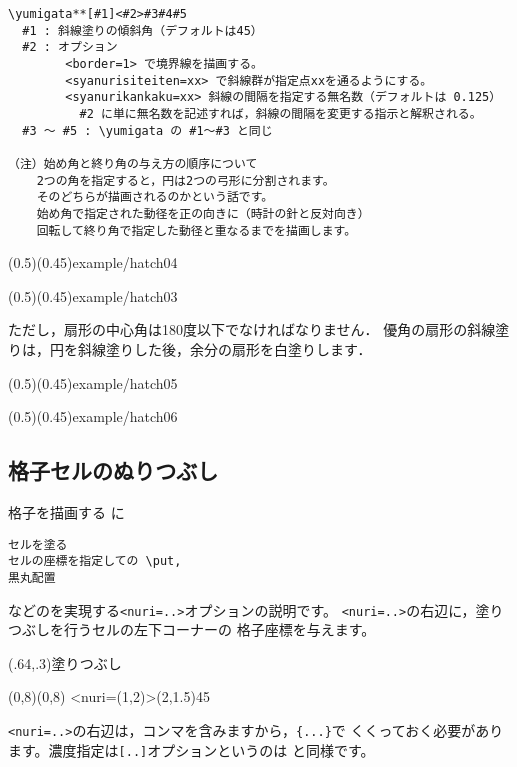 \begin{boxnote}
\begin{verbatim}
\yumigata**[#1]<#2>#3#4#5
  #1 : 斜線塗りの傾斜角（デフォルトは45）
  #2 : オプション
        <border=1> で境界線を描画する。
        <syanurisiteiten=xx> で斜線群が指定点xxを通るようにする。
        <syanurikankaku=xx> 斜線の間隔を指定する無名数（デフォルトは 0.125）
          #2 に単に無名数を記述すれば，斜線の間隔を変更する指示と解釈される。
  #3 〜 #5 : \yumigata の #1〜#3 と同じ

（注）始め角と終り角の与え方の順序について
    2つの角を指定すると，円は2つの弓形に分割されます。
    そのどちらが描画されるのかという話です。
    始め角で指定された動径を正の向きに（時計の針と反対向き）
    回転して終り角で指定した動径と重なるまでを描画します。
\end{verbatim}
\end{boxnote}

\showexample[弓形の斜線塗り](0.5)(0.45){example/hatch04}

\showexample[扇形の斜線塗り](0.5)(0.45){example/hatch03}

ただし，扇形の中心角は180度以下でなければなりません．
優角の扇形の斜線塗りは，円を斜線塗りした後，余分の扇形を白塗りします．

(0.5)(0.45){example/hatch05}

(0.5)(0.45){example/hatch06}

\subsection{格子セルのぬりつぶし}
格子を描画する  に
\begin{jquote}
\begin{verbatim}
セルを塗る
セルの座標を指定しての \put, 
黒丸配置
\end{verbatim}
\end{jquote}
などのを実現する\texttt{<nuri=..>}オプションの説明です。
\verb+<nuri=..>+の右辺に，塗りつぶしを行うセルの左下コーナーの
格子座標を与えます。

\begin{showEx}(.64,.3){塗りつぶし}
\begin{zahyou*}[ul=4mm](0,8)(0,8)
\kousi<nuri={(1,2)}>(2,1.5){4}{5}
\end{zahyou*}
\end{showEx}

\verb+<nuri=..>+の右辺は，コンマを含みますから，\verb+{...}+で
くくっておく必要があります。濃度指定は\verb+[..]+オプションというのは
と同様です。

